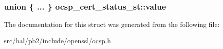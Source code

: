 \subsubsection[{\texorpdfstring{value}{value}}]{\setlength{\rightskip}{0pt plus 5cm}union \{ ... \}   ocsp\+\_\+cert\+\_\+status\+\_\+st\+::value}\hypertarget{structocsp__cert__status__st_a6d4c1250dc9b5223323e54da986baf60}{}\label{structocsp__cert__status__st_a6d4c1250dc9b5223323e54da986baf60}


The documentation for this struct was generated from the following file\+:\begin{DoxyCompactItemize}
\item 
src/hal/pb2/include/openssl/\hyperlink{ocsp_8h}{ocsp.\+h}\end{DoxyCompactItemize}
